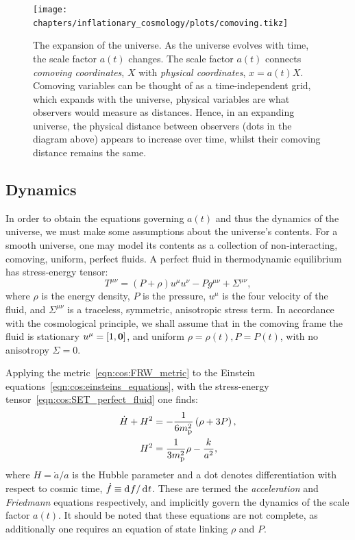 \begin{figure}[tp]
  \centering
  \texttt{[image: chapters/inflationary\_cosmology/plots/comoving.tikz]}
  \caption{The expansion of the universe. As the universe evolves with time, the scale factor \(a(t)\) changes. The scale factor \(a(t)\) connects {\em comoving coordinates}, \(X\) with {\em physical coordinates}, \(x=a(t)X\). Comoving variables can be thought of as a time-independent grid, which expands with the universe, physical variables are what observers would measure as distances. Hence, in an expanding universe, the physical distance between observers (dots in the diagram above) appears to increase over time, whilst their comoving distance remains the same.}\label{fig:cos:comoving_vs_physical}
\end{figure}


\subsection{Dynamics}
In order to obtain the equations governing \(a(t)\) and thus the dynamics of the universe, we must make some assumptions about the universe's contents. For a smooth universe, one may model its contents as a collection of non-interacting, comoving, uniform, perfect fluids. A perfect fluid in thermodynamic equilibrium has stress-energy tensor:
\begin{equation}
  T^{\mu\nu} = (P+\rho)u^{\mu}u^{\nu} - P g^{\mu\nu} + \Sigma^{\mu\nu},
  \label{eqn:cos:SET_perfect_fluid}
\end{equation}
where \(\rho\) is the energy density, \(P\) is the pressure, \(u^\mu\) is the four velocity of the fluid, and \(\Sigma^{\mu\nu}\) is a traceless, symmetric, anisotropic stress term. In accordance with the cosmological principle, we shall assume that in the comoving frame the fluid is stationary \(u^\mu = [1,\mathbf{0}]\), and uniform \(\rho=\rho(t),P=P(t)\), with no anisotropy \(\Sigma=0\).  

Applying the metric~\eqref{eqn:cos:FRW_metric} to the Einstein equations~\eqref{eqn:cos:einsteins_equations}, with the stress-energy tensor~\eqref{eqn:cos:SET_perfect_fluid} one finds:
\begin{align}
  \dot{H}+H^2 &= 
  -\frac{1}{6m_{\mathrm{p}}^2}\left( \rho + 3P\right), 
  \label{eqn:cos:Raychaudhuri}
  \\
  H^2 &= 
  \frac{1}{3m_{\mathrm{p}}^2}\rho - \frac{k}{a^2}, 
  \label{eqn:cos:Friedmann}
\end{align}
where \(H=\dot{a}/a\) is the Hubble parameter and a dot denotes differentiation with respect to cosmic time, \(\dot{f}\equiv \operatorname{d}^{}\!{f}/\operatorname{d}^{}\!{t}\). These are termed the {\em acceleration\/} and {\em Friedmann\/} equations respectively, and implicitly govern the dynamics of the scale factor \(a(t)\). It should be noted that these equations are not complete, as additionally one requires an equation of state linking \(\rho\) and \(P\).


